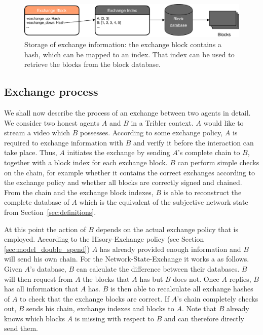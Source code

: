\begin{figure}
    \centering
    \includegraphics[width=\textwidth]{images/exchange_block_retrieval.pdf}
    \caption{Storage of exchange information: the exchange block contains a hash, which can be mapped to an index. That index can be used to retrieve the blocks from the block database.}
    \label{fig:exchange_process}
\end{figure}

\subsection{Exchange process}
We shall now describe the process of an exchange between two agents in detail. We consider two honest 
agents $A$ and $B$ in a Tribler context. $A$ would like to stream a video which $B$ possesses. According
to some exchange policy, $A$ is required to exchange information with $B$ and verify it before the 
interaction can take place. Thus, $A$ initiates the exchange by sending $A$'s complete chain to $B$,
together with a block index for each exchange block.
$B$ can perform simple checks on the chain, for example whether it contains the correct exchanges 
according to the exchange policy and whether all blocks are correctly signed and chained. From the 
chain and the exchange block indexes, $B$ is able to reconstruct the complete database of $A$ which 
is the equivalent of the subjective network state from Section~\ref{sec:definitions}. 

At this point the action of $B$ depends on the actual exchange policy that is employed. According to
the Hisory-Exchange policy (see Section \ref{sec:model_double_spend}) $A$ has already provided 
enough information and $B$ will send his own chain. For the Network-State-Exchange it works a as
follows. Given $A$'s database, $B$ can calculate the difference between their databases. $B$ will 
then request from $A$ the blocks that $A$ has but $B$ does not. Once $A$ replies, $B$ has all 
information that $A$ has. $B$ is then able to recalculate all exchange hashes of $A$ to check that 
the exchange blocks are correct. If $A$'s chain completely checks out, $B$ sends his chain, exchange
indexes and blocks to $A$. Note that $B$ already knows which blocks $A$ is missing with respect to 
$B$ and can therefore directly send them. 

